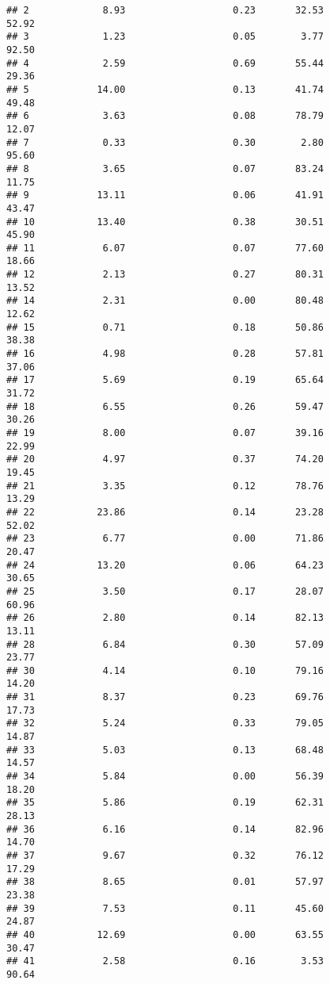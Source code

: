 \documentclass[
]{article}
\begin{document}
\begin{verbatim}
## 2             8.93                   0.23       32.53          52.92
## 3             1.23                   0.05        3.77          92.50
## 4             2.59                   0.69       55.44          29.36
## 5            14.00                   0.13       41.74          49.48
## 6             3.63                   0.08       78.79          12.07
## 7             0.33                   0.30        2.80          95.60
## 8             3.65                   0.07       83.24          11.75
## 9            13.11                   0.06       41.91          43.47
## 10           13.40                   0.38       30.51          45.90
## 11            6.07                   0.07       77.60          18.66
## 12            2.13                   0.27       80.31          13.52
## 14            2.31                   0.00       80.48          12.62
## 15            0.71                   0.18       50.86          38.38
## 16            4.98                   0.28       57.81          37.06
## 17            5.69                   0.19       65.64          31.72
## 18            6.55                   0.26       59.47          30.26
## 19            8.00                   0.07       39.16          22.99
## 20            4.97                   0.37       74.20          19.45
## 21            3.35                   0.12       78.76          13.29
## 22           23.86                   0.14       23.28          52.02
## 23            6.77                   0.00       71.86          20.47
## 24           13.20                   0.06       64.23          30.65
## 25            3.50                   0.17       28.07          60.96
## 26            2.80                   0.14       82.13          13.11
## 28            6.84                   0.30       57.09          23.77
## 30            4.14                   0.10       79.16          14.20
## 31            8.37                   0.23       69.76          17.73
## 32            5.24                   0.33       79.05          14.87
## 33            5.03                   0.13       68.48          14.57
## 34            5.84                   0.00       56.39          18.20
## 35            5.86                   0.19       62.31          28.13
## 36            6.16                   0.14       82.96          14.70
## 37            9.67                   0.32       76.12          17.29
## 38            8.65                   0.01       57.97          23.38
## 39            7.53                   0.11       45.60          24.87
## 40           12.69                   0.00       63.55          30.47
## 41            2.58                   0.16        3.53          90.64

\end{verbatim}
\end{document}
